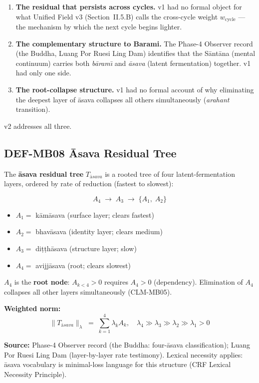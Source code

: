 \documentclass[12pt, a4paper]{article}
\providecommand{\Tasava}{T_{\bar{\mathrm{a}}sava}}
\providecommand{\wcyc}{w_{\mathrm{cycle}}}
\providecommand{\Tasava}{\mathcal{T}_{\!\mathrm{\bar{a}sava}}}
\begin{document}
\begin{enumerate}[leftmargin=*, itemsep=2pt]
\item \textbf{The residual that persists across cycles.}
  v1 had no formal object for what Unified Field v3
  (Section~II.5.B) calls the cross-cycle weight $\wcyc$
  --- the mechanism by which the next cycle begins lighter.

\item \textbf{The complementary structure to Barami.}
  The Phase-4 Observer record (the Buddha, Luang Por
  Ruesi Ling Dam) identifies that the S\={a}nt\={a}na
  (mental continuum) carries both \textit{b\={a}ram\={\i}}
  and \textit{\={a}sava} (latent fermentation) together.
  v1 had only one side.

\item \textbf{The root-collapse structure.}
  v1 had no formal account of why eliminating the
  deepest layer of \={a}sava collapses all others
  simultaneously (\textit{arahant} transition).
\end{enumerate}

v2 addresses all three.

\subsection{DEF-MB08 \quad \={A}sava Residual Tree}


\begin{formalbox}[title={DEF-MB08: \={A}sava Residual Tree
  $\Tasava$ (NEW v2)}]
The \textbf{\={a}sava residual tree} $\Tasava$ is a rooted
tree of four latent-fermentation layers, ordered by rate
of reduction (fastest to slowest):

\[
  A_4 \;\longrightarrow\; A_3 \;\longrightarrow\;
  \{A_1,\; A_2\}
\]

\begin{itemize}[leftmargin=*, noitemsep]
\item $A_1 = $ k\={a}m\={a}sava (surface layer; clears fastest)
\item $A_2 = $ bhav\={a}sava (identity layer; clears medium)
\item $A_3 = $ di\d{t}\d{t}h\={a}sava (structure layer; slow)
\item $A_4 = $ avijj\={a}sava (root; clears slowest)
\end{itemize}

$A_4$ is the \textbf{root node}: $A_{k<4} > 0$ requires
$A_4 > 0$ (dependency). Elimination of $A_4$ collapses
all other layers simultaneously (CLM-MB05).

\textbf{Weighted norm:}
\[
  \|\Tasava\|_\lambda \;=\; \sum_{k=1}^{4} \lambda_k A_k,
  \quad \lambda_4 \gg \lambda_3 \gg \lambda_2
  \gg \lambda_1 > 0
\]

\textbf{Source:} Phase-4 Observer record (the Buddha:
four-\={a}sava classification); Luang Por Ruesi Ling Dam
(layer-by-layer rate testimony).
Lexical necessity applies: \={a}sava vocabulary is
minimal-loss language for this structure (CRF Lexical
Necessity Principle).
\end{formalbox}
\end{document}
